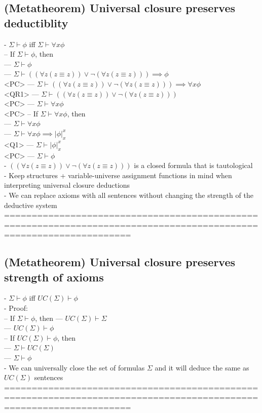 \documentclass{book}
\newcommand{\sub}[3]{\left|#1\right|_{#3}^{#2}}
\begin{document}
\subsection{(Metatheorem) Universal closure preserves deductiblity} %
	- $\Sigma \vdash \phi$ iff $\Sigma \vdash \forall x \phi$ \\
		-- If $\Sigma \vdash \phi$, then \\
			--- $\Sigma \vdash \phi$ \\
			--- $\Sigma \vdash ((\forall z (z \equiv z)) \lor \lnot (\forall z (z \equiv z))) \implies \phi$ \\ <PC>
			--- $\Sigma \vdash ((\forall z (z \equiv z)) \lor \lnot (\forall z (z \equiv z))) \implies \forall x \phi$ \\ <QR1>
			--- $\Sigma \vdash ((\forall z (z \equiv z)) \lor \lnot (\forall z (z \equiv z)))$ \\ <PC>
			--- $\Sigma \vdash \forall x \phi$ \\ <PC>
		-- If $\Sigma \vdash \forall x \phi$, then \\
			--- $\Sigma \vdash  \forall x \phi$ \\
			--- $\Sigma \vdash  \forall x \phi \implies \sub{\phi}{x}{x}$ \\ <Q1>
			--- $\Sigma \vdash  \sub{\phi}{x}{x}$ \\ <PC>
			--- $\Sigma \vdash \phi$ \\
		- $((\forall z (z \equiv z)) \lor \lnot (\forall z (z \equiv z)))$ is a closed formula that is tautological \\
		- Keep structures + variable-universe assignment functions in mind when interpreting universal closure deductions \\
		- We can replace axioms with all sentences without changing the strength of the deductive system \\
	===================================================================================================================
\subsection{(Metatheorem) Universal closure preserves strength of axioms} %
	- $\Sigma \vdash \phi$ iff $UC(\Sigma) \vdash \phi$ \\
	- Proof: \\
		-- If $\Sigma \vdash \phi$, then
			--- $UC(\Sigma) \vdash \Sigma$ \\
			--- $UC(\Sigma) \vdash \phi$ \\
		-- If $UC(\Sigma) \vdash \phi$, then \\
			--- $\Sigma \vdash UC(\Sigma)$ \\
			--- $\Sigma \vdash \phi$ \\
	- We can universally close the set of formulas $\Sigma$ and it will deduce the same as $UC(\Sigma)$ sentences \\
	===================================================================================================================
\end{document}
